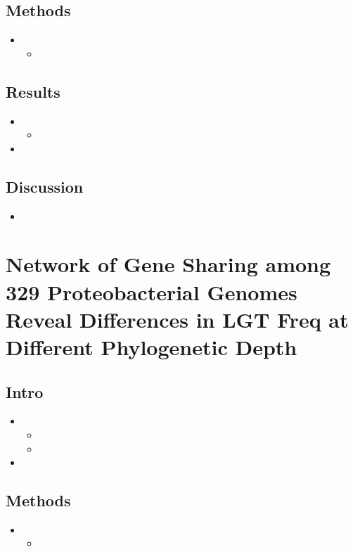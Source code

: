 \documentclass[10pt,letter]{article}
\begin{document}
\subsection*{Methods}
\begin{itemize}
    \item
    \begin{itemize}
        \item
    \end{itemize}
\end{itemize}
\subsection*{Results}
\begin{itemize}
    \item
    \begin{itemize}
        \item
    \end{itemize}
    \item
\end{itemize}
\subsection*{Discussion}
\begin{itemize}
    \item
\end{itemize}
\section*{Network of Gene Sharing among 329 Proteobacterial Genomes Reveal Differences in LGT Freq at Different Phylogenetic Depth\cite{}}
\subsection*{Intro}
\begin{itemize}
    \item
    \begin{itemize}
        \item
        \item
    \end{itemize}
    \item
\end{itemize}
\subsection*{Methods}
\begin{itemize}
    \item
    \begin{itemize}
        \item
    \end{itemize}
\end{itemize}
\end{document}
